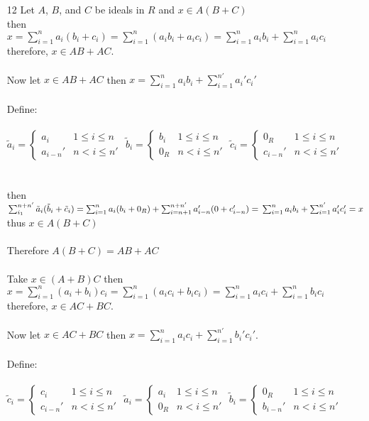 \documentclass[12pt]{extarticle}
\begin{document}
\begin{enumerate}
\begin{enumerate}
\item[12] Let $A$, $B$, and $C$ be ideals in $R$ and $x \in A(B+C)$ \\ then $x = \sum_{i = 1}^n a_i (b_i + c_i) = \sum_{i = 1}^n (a_i b_i + a_i c_i) = \sum_{i = 1}^n a_i b_i + \sum_{i = 1}^n a_i c_i$ therefore, $x \in AB + AC$. \\ \\
Now let $x \in AB + AC$ then $x = \sum_{i = 1}^n a_i b_i + \sum_{i = 1}^{n'} a_i' c_i'$ \\ \\ Define: \\ \\ $\tilde{a}_i = \begin{cases} a_i & 1 \leq i \leq n \\ a_{i-n}' & n < i \leq n' \end{cases}$ \quad $\tilde{b}_i = \begin{cases} b_i & 1 \leq i \leq n \\ 0_R & n < i \leq n' \end{cases}$ \quad $\tilde{c}_i = \begin{cases} 0_R & 1 \leq i \leq n \\ c_{i-n}' & n < i \leq n' \end{cases}$ \\ \\ \\ then  $\sum_{i_1}^{n+n'} \tilde{a}_i (\tilde{b}_i + \tilde{c}_i) = \sum_{i = 1}^{n} a_i (b_i + 0_R) + \sum_{i = n + 1}^{n+n'} a_{i-n}' (0 + c_{i-n}') = \\ \sum_{i = 1}^{n} a_i b_i + \sum_{i = 1}^{n'} a_i' c_i' = x$ thus $x \in A(B+C)$ \\ \\ Therefore $A(B+C) = AB + AC$ \\ \\
Take $x \in (A+B)C$ then $x = \sum_{i = 1}^n (a_i  + b_i) c_i = \sum_{i = 1}^n (a_i c_i + b_i c_i) = \sum_{i = 1}^n a_i c_i + \sum_{i = 1}^n b_i c_i$ therefore, $x \in AC + BC$. \\ \\
Now let $x \in AC + BC$ then $x = \sum_{i = 1}^n a_i c_i + \sum_{i = 1}^{n'} b_i' c_i'$. \\ \\ Define: \\ \\
$\tilde{c}_i = \begin{cases} c_i & 1 \leq i \leq n \\ c_{i-n}' & n < i \leq n' \end{cases}$ \quad $\tilde{a}_i = \begin{cases} a_i & 1 \leq i \leq n \\ 0_R & n < i \leq n' \end{cases}$ \quad $\tilde{b}_i = \begin{cases} 0_R & 1 \leq i \leq n \\ b_{i-n}' & n < i \leq n' \end{cases}$ \\ \\ \\

\end{enumerate}
\end{enumerate}
\end{document}

